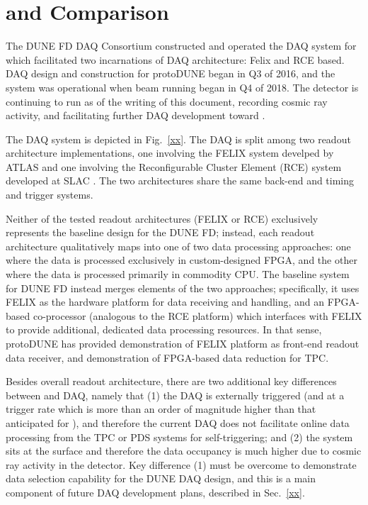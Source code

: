 \section{ and  Comparison}
\label{sec:fd-daq:protodune}

The DUNE FD DAQ Consortium constructed and operated the DAQ system for
 which facilitated two incarnations of DAQ
architecture: Felix and RCE based. DAQ design and construction for
protoDUNE began in Q3 of 2016, and the system was operational when
 beam running began in Q4 of 2018. The detector is
continuing to run as of the writing of this document, recording cosmic
ray activity, and facilitating further DAQ development toward
.

The  DAQ system is depicted in
Fig.~\ref{xx}. The DAQ is split among two readout architecture
implementations, one involving the FELIX system develped by ATLAS \cite{xx} and one
involving the Reconfigurable Cluster Element (RCE) system developed at
SLAC \cite{xx}. The two architectures share the same back-end and
timing and trigger systems. 

Neither of the tested readout architectures (FELIX or RCE) exclusively represents the
baseline design for the DUNE FD; instead, each readout architecture
qualitatively maps into one of
two data processing approaches: one where the data is processed
exclusively in
custom-designed FPGA, and the other where the data is processed primarily in commodity
CPU. The baseline system for DUNE FD  instead
merges elements of the two approaches; specifically, it uses FELIX as
the hardware platform for data receiving and handling, and an
FPGA-based co-processor (analogous to the RCE platform) which
interfaces with FELIX to provide additional, dedicated data processing
resources. In that sense, protoDUNE has provided demonstration of
FELIX platform as front-end readout data receiver, and
demonstration of FPGA-based data reduction for TPC.

Besides overall readout architecture, there are two additional key differences between  and
 DAQ, namely that (1) the  DAQ is externally
triggered (and at a trigger rate which is more than an order of
magnitude higher than that anticipated for ),
and therefore the current  DAQ does not facilitate online data
processing from the TPC or PDS systems for self-triggering; and (2) the
system sits at the surface and therefore the data occupancy is much higher
due to cosmic ray activity in the detector. Key difference (1) must be
overcome to demonstrate data selection capability for the DUNE DAQ
design, and this is a main component of future DAQ development plans, described
in Sec.~\ref{xx}.

